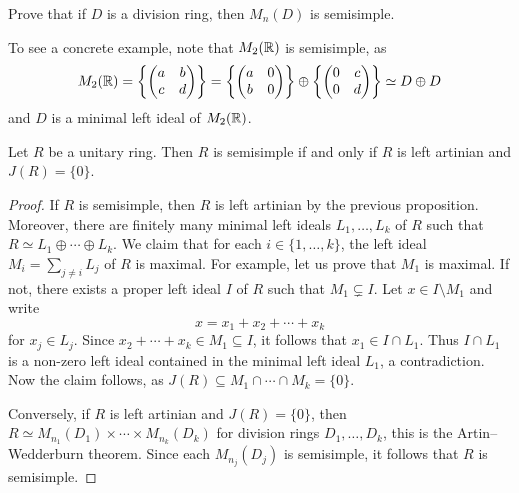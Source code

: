 
\begin{exercise}
\label{xca:M_n(D)_semisimple}
    Prove that if $D$ is a division ring, then 
    $M_n(D)$ is semisimple. 
\end{exercise}

To see a concrete example, note that  
$M_2(\mathbb{R})$ is semisimple, as  
\[
M_2(\mathbb{R})=\left\{\begin{pmatrix}
a&b\\
c&d
\end{pmatrix}\right\}
=
\left\{\begin{pmatrix}
a&0\\
b&0
\end{pmatrix}\right\}
\oplus
\left\{\begin{pmatrix}
0&c\\
0&d
\end{pmatrix}\right\}\simeq D\oplus D
\]
and $D$ is a minimal left ideal of $M_2(\mathbb{R})$. 

\begin{theorem}
	\label{thm:SSartin=J}
	Let $R$ be a unitary ring. Then $R$ is semisimple if and only if 
	$R$ is left artinian and $J(R)=\{0\}$.
\end{theorem}

\begin{proof}
    If $R$ is semisimple, then $R$ is left artinian by the previous proposition. 
    Moreover, 
    there are finitely many 
    minimal left ideals $L_1,\dots,L_k$ of $R$ 
    such that $R\simeq L_1\oplus\cdots\oplus L_k$. We claim that
    for each $i\in\{1,\dots,k\}$, the left ideal
    $M_i=\sum_{j\ne i}L_j$ of $R$ is maximal. For example, let us prove
    that $M_1$ is maximal. If not, there exists a proper left ideal $I$ of $R$ 
    such that $M_1\subsetneq I$. Let $x\in I\setminus M_1$ and write 
    \[
    x=x_1+x_2+\cdots+x_k
    \]
    for $x_j\in L_j$. Since $x_2+\cdots+x_k\in M_1\subseteq I$, 
    it follows that $x_1\in I\cap L_1$. Thus $I\cap L_1$ is a non-zero left ideal contained in the minimal left ideal $L_1$, a contradiction. Now the claim follows, as
    $J(R)\subseteq M_1\cap\cdots\cap M_k=\{0\}$. 
    
    Conversely, if $R$ is left artinian and $J(R)=\{0\}$, then
    $R\simeq M_{n_1}(D_1)\times\cdots\times M_{n_k}(D_k)$ 
    for division rings $D_1,\dots,D_k$, this is the 
    Artin--Wedderburn theorem. 
    Since each $M_{n_j}(D_j)$ 
    is semisimple, it follows that $R$ is semisimple. 
\end{proof}

